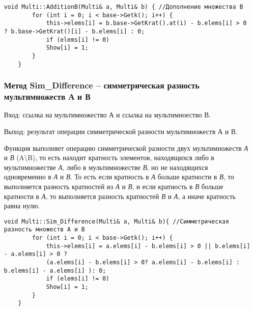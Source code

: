 \documentclass[10pt,a4paper,final]{article} %
\begin{document}
\begin{lstlisting}[caption={Метод AdditionB}]
	void Multi::AdditionB(Multi& a, Multi& b) { //Дополнение множества B
		for (int i = 0; i < base->Getk(); i++) {
			this->elems[i] = b.base->GetKrat().at(i) - b.elems[i] > 0 ? b.base->GetKrat()[i] - b.elems[i] : 0;
			if (elems[i] != 0)
			Show[i] = 1;
		}
	}
\end{lstlisting}


\subsubsection {Метод Sim\_Difference -- симметрическая разность мультимножеств А и В}
\par Вход: ссылка на мультимножество А и ссылка на мультимноество В. 
\par Выход: результат операции симметрической разности мультимножеств А и В.
\par Функция выполняет операцию симметрической разности двух мультимножеств \textit{А} и \textit{В} (A\textbackslash B), то есть находит кратность элементов, находящихся либо в мультимножестве \textit{А}, либо в мультимножестве \textit{В}, но не находящихся одновременно в \textit{А} и \textit{В}. То есть если кратность в \textit{А} больше кратности в \textit{В}, то выполняется разность кратностей из \textit{А} и \textit{В}, и если кратность в \textit{В} больше кратности в \textit{А}, то выполняется разность кратностей \textit{В} и \textit{А}, а иначе кратность равна нулю.
 
 \begin{lstlisting}[caption={Метод Sim\_Difference}]
 	void Multi::Sim_Difference(Multi& a, Multi& b){ //Симметрическая разность множеств A и B
 		for (int i = 0; i < base->Getk(); i++) {
 			this->elems[i] = a.elems[i] - b.elems[i] > 0 || b.elems[i] - a.elems[i] > 0 ? 
 			(a.elems[i] - b.elems[i] > 0? a.elems[i] - b.elems[i] : b.elems[i] - a.elems[i] ): 0;
 			if (elems[i] != 0)
 			Show[i] = 1;
 		}
 	}
 \end{lstlisting}
 
 
\end{document}
